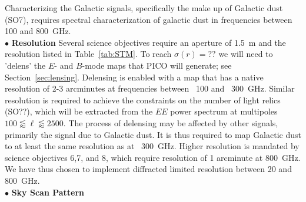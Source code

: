 \documentclass[PICOReport.tex]{subfiles}
\begin{document}
Characterizing the Galactic signals, specifically the make up of Galactic dust (SO7), requires spectral characterization 
of galactic dust in frequencies between 100 and 800~GHz.  \\
%
$\bullet$ {\bf Resolution} \hspace{0.1in} 
Several science objectives require an aperture of 1.5~m and the resolution listed in Table~\ref{tab:STM}. To reach 
$\sigma(r) = ??$ we will need to 'delens' the $E$- and $B$-mode maps that PICO will generate; see Section~\ref{sec:lensing}. 
Delensing is enabled with a map that has a native resolution of 2-3 arcminutes at frequencies between ~100 and ~300~GHz. 
Similar resolution is required to achieve the constraints on the number of light relics (SO??), which will be extracted from the 
$EE$ power spectrum at multipoles $100 \lessapprox \ell \lessapprox 2500$.  
The process of delensing may be affected by other signals, primarily the signal due to Galactic dust. It is thus required to 
map Galactic dust to at least the same resolution as at ~300~GHz. Higher resolution is mandated by science objectives 
6,7, and 8, which require resolution of 1 arcminute at 800~GHz.  We have thus chosen to implement diffracted limited 
resolution between 20 and 800~GHz. \\
%
$\bullet$ {\bf Sky Scan Pattern} \hspace{0.1in} 

 
\end{document}

